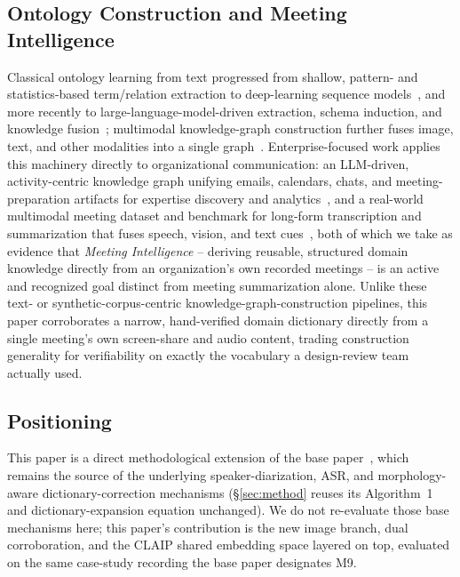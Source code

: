 ﻿\documentclass[twocolumn]{article}
\begin{document}
\subsection{Ontology Construction and Meeting Intelligence}

Classical ontology learning from text progressed from shallow, pattern- and statistics-based
term/relation extraction to deep-learning sequence models~\cite{al-aswadi2020ontology}, and more
recently to large-language-model-driven extraction, schema induction, and knowledge
fusion~\cite{du2024ontologyllm,bian2025llmkg}; multimodal knowledge-graph construction further fuses
image, text, and other modalities into a single graph~\cite{chen2023multimodalkg}. Enterprise-focused
work applies this machinery directly to organizational communication: an LLM-driven, activity-centric
knowledge graph unifying emails, calendars, chats, and meeting-preparation artifacts for expertise
discovery and analytics~\cite{kumar2025llmkgenterprise}, and a real-world multimodal meeting dataset
and benchmark for long-form transcription and summarization that fuses speech, vision, and text
cues~\cite{hangchen2025misp}, both of which we take as evidence that \emph{Meeting Intelligence} --
deriving reusable, structured domain knowledge directly from an organization's own recorded meetings
-- is an active and recognized goal distinct from meeting summarization alone. Unlike these text- or
synthetic-corpus-centric knowledge-graph-construction pipelines, this paper corroborates a narrow,
hand-verified domain dictionary directly from a single meeting's own screen-share and audio content,
trading construction generality for verifiability on exactly the vocabulary a design-review team
actually used.

\subsection{Positioning}

This paper is a direct methodological extension of the base paper~\cite{yasuno2026meetingasr}, which
remains the source of the underlying speaker-diarization, ASR, and morphology-aware
dictionary-correction mechanisms (\S\ref{sec:method} reuses its Algorithm~1 and dictionary-expansion
equation unchanged). We do not re-evaluate those base mechanisms here; this
paper's contribution is the new image branch, dual corroboration, and the CLAIP shared embedding
space layered on top, evaluated on the same case-study recording the base paper designates M9.
\end{document}
